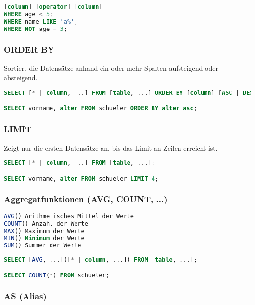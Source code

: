 \begin{lstlisting}[language=sql]
[column] [operator] [column]
WHERE age < 5;
WHERE name LIKE 'a%';
WHERE NOT age = 3;
\end{lstlisting}

\clearpage

\subsubsection{ORDER BY}

Sortiert die Datensätze anhand ein oder mehr Spalten aufsteigend oder absteigend.

\begin{lstlisting}[language=sql]
SELECT [* | column, ...] FROM [table, ...] ORDER BY [column] [ASC | DESC];

SELECT vorname, alter FROM schueler ORDER BY alter asc;
\end{lstlisting}

\subsubsection{LIMIT}

Zeigt nur die ersten Datensätze an, bis das Limit an Zeilen erreicht ist.

\begin{lstlisting}[language=sql]
SELECT [* | column, ...] FROM [table, ...];

SELECT vorname, alter FROM schueler LIMIT 4;
\end{lstlisting}

\subsubsection{Aggregatfunktionen (AVG, COUNT, ...)}

\begin{lstlisting}[language=sql]
AVG() Arithmetisches Mittel der Werte
COUNT() Anzahl der Werte
MAX() Maximum der Werte
MIN() Minimum der Werte
SUM() Summer der Werte
\end{lstlisting}

\begin{lstlisting}[language=sql]
SELECT [AVG, ...]([* | column, ...]) FROM [table, ...];

SELECT COUNT(*) FROM schueler;
\end{lstlisting}

\subsubsection{AS (Alias)}

